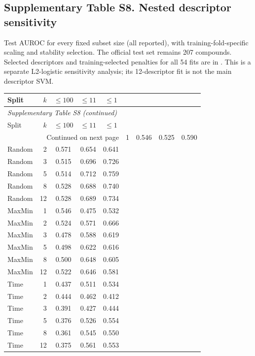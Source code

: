 \subsection*{Supplementary Table S8. Nested descriptor sensitivity}

Test AUROC for every fixed subset size (all reported), with training-fold-specific scaling and stability selection. The official test set remains 207 compounds. Selected descriptors and training-selected penalties for all 54 fits are in . This is a separate L2-logistic sensitivity analysis; its 12-descriptor fit is not the main descriptor SVM.

\begingroup\small\setlength{\tabcolsep}{4pt}

\begin{longtable}{lrccc}

\toprule Split & $k$ & $\leq100$ & $\leq11$ & $\leq1$ \\ \midrule\endfirsthead

\multicolumn{5}{l}{\textit{Supplementary Table S8 (continued)}} \\

\toprule Split & $k$ & $\leq100$ & $\leq11$ & $\leq1$ \\ \midrule\endhead

\midrule\multicolumn{5}{r}{Continued on next page}\endfoot\bottomrule\endlastfoot

Random & 1 & 0.546 & 0.525 & 0.590 \\
Random & 2 & 0.571 & 0.654 & 0.641 \\
Random & 3 & 0.515 & 0.696 & 0.726 \\
Random & 5 & 0.514 & 0.712 & 0.759 \\
Random & 8 & 0.528 & 0.688 & 0.740 \\
Random & 12 & 0.528 & 0.689 & 0.734 \\
MaxMin & 1 & 0.546 & 0.475 & 0.532 \\
MaxMin & 2 & 0.524 & 0.571 & 0.666 \\
MaxMin & 3 & 0.478 & 0.588 & 0.619 \\
MaxMin & 5 & 0.498 & 0.622 & 0.616 \\
MaxMin & 8 & 0.500 & 0.648 & 0.605 \\
MaxMin & 12 & 0.522 & 0.646 & 0.581 \\
Time & 1 & 0.437 & 0.511 & 0.534 \\
Time & 2 & 0.444 & 0.462 & 0.412 \\
Time & 3 & 0.391 & 0.427 & 0.444 \\
Time & 5 & 0.376 & 0.526 & 0.554 \\
Time & 8 & 0.361 & 0.545 & 0.550 \\
Time & 12 & 0.375 & 0.561 & 0.553 \\

\end{longtable}\endgroup

